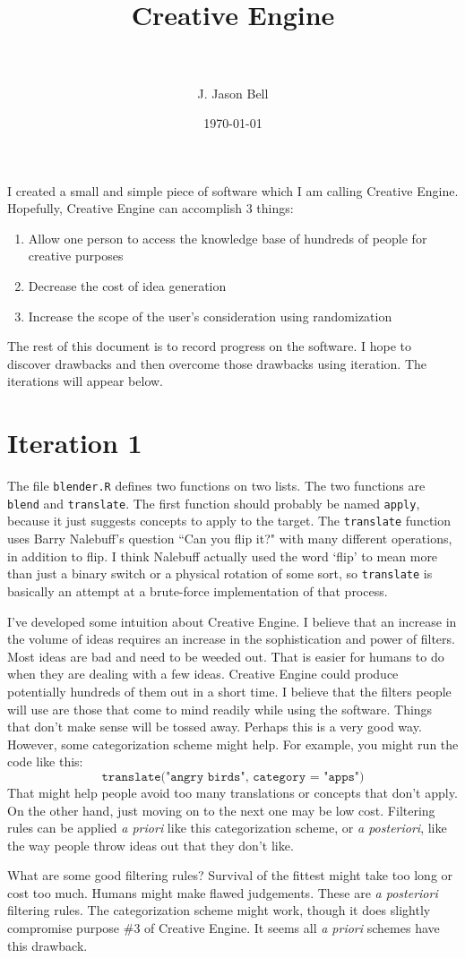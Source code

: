\documentclass[paper=a4, fontsize=11pt]{scrartcl} %
\title{	
\normalfont \normalsize 
\horrule{0.5pt} \\[0.4cm] %
\huge Creative Engine \\ %
\horrule{2pt} \\[0.5cm] %
}
\author{J. Jason Bell} %
\date{\normalsize\today} %
\numberwithin{equation}{section} %
\numberwithin{figure}{section} %
\numberwithin{table}{section} %
\newcommand{\code}[1]{\texttt{#1}}
\begin{document}
\maketitle %

I created a small and simple piece of software which I am calling Creative Engine.  Hopefully, Creative Engine can accomplish 3 things:
\begin{enumerate}
\item Allow one person to access the knowledge base of hundreds of people for creative purposes
\item Decrease the cost of idea generation
\item Increase the scope of the user's consideration using randomization
\end{enumerate}
The rest of this document is to record progress on the software.  I hope to discover drawbacks and then overcome those drawbacks using iteration.  The iterations will appear below.

\section*{Iteration 1}

The file \code{blender.R} defines two functions on two lists.  The two functions are \code{blend} and \code{translate}.  The first function should probably be named \code{apply}, because it just suggests concepts to apply to the target.  The \code{translate} function uses Barry Nalebuff's question ``Can you flip it?" with many different operations, in addition to flip.  I think Nalebuff actually used the word `flip' to mean more than just a binary switch or a physical rotation of some sort, so \code{translate} is basically an attempt at a brute-force implementation of that process.

I've developed some intuition about Creative Engine.  I believe that an increase in the volume of ideas requires an increase in the sophistication and power of filters.  Most ideas are bad and need to be weeded out.  That is easier for humans to do when they are dealing with a few ideas.  Creative Engine could produce potentially hundreds of them out in a short time.  I believe that the filters people will use are those that come to mind readily while using the software.  Things that don't make sense will be tossed away.  Perhaps this is a very good way.  However, some categorization scheme might help.  For example, you might run the code like this:
$$\code{translate("angry birds", category = "apps")}$$  
That might help people avoid too many translations or concepts that don't apply.  On the other hand, just moving on to the next one may be low cost.  Filtering rules can be applied \textit{a priori} like this categorization scheme, or \textit{a posteriori}, like the way people throw ideas out that they don't like.

What are some good filtering rules?  Survival of the fittest might take too long or cost too much.  Humans might make flawed judgements. These are \textit{a posteriori} filtering rules.  The categorization scheme might work, though it does slightly compromise purpose \#3 of Creative Engine.  It seems all \textit{a priori} schemes have this drawback.  
\end{document}
